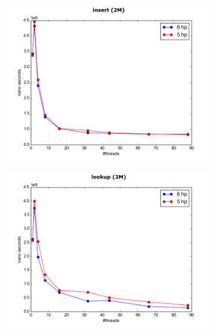 \documentclass[conference]{IEEEtran}
\begin{document}
	\begin{figure}
		\begin{subfigure}{.5\textwidth}
			\includegraphics[width=0.45\paperwidth]{hp_comapre/insert_2M_5hp.png}
			\label{fig:5hp_insert}			
		\end{subfigure}
		\begin{subfigure}{.5\textwidth}
			\includegraphics[width=0.45\paperwidth]{hp_comapre/lookup_2M_5hp.png}	
			\label{fig:5hp_lookup}
		\end{subfigure}
		\begin{subfigure}{.5\textwidth}

\end{subfigure}
\end{figure}
\end{document}
